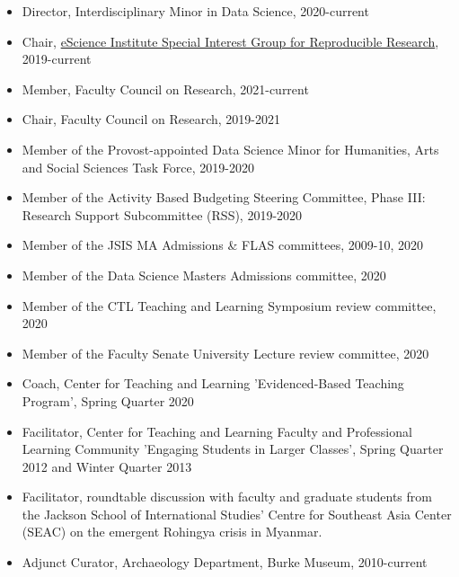 \begin{itemize}[noitemsep, font=$\bullet$\scshape\bfseries]

\item  Director, Interdisciplinary Minor in Data Science, 2020-current

\item Chair, \href{http://uwescience.github.io/reproducible/}{eScience Institute Special Interest Group for Reproducible Research}, 2019-current

\item  Member, Faculty Council on Research, 2021-current

\item  Chair, Faculty Council on Research, 2019-2021

\item  Member of the Provost-appointed Data Science Minor for Humanities, Arts and Social Sciences Task Force, 2019-2020

\item  Member of the Activity Based Budgeting Steering Committee, Phase III:  Research Support Subcommittee (RSS), 2019-2020

\item  Member of the JSIS MA Admissions \& FLAS committees, 2009-10, 2020

\item  Member of the Data Science Masters Admissions committee, 2020

\item  Member of the CTL Teaching and Learning Symposium review committee, 2020

\item  Member of the Faculty Senate University Lecture review committee, 2020

\item  Coach, Center for Teaching and Learning 'Evidenced-Based Teaching Program', Spring Quarter 2020

\item  Facilitator, Center for Teaching and Learning Faculty and Professional Learning Community 'Engaging Students in Larger Classes', Spring Quarter 2012 and Winter Quarter 2013

\item  Facilitator, roundtable discussion with faculty and graduate students from the Jackson School of International Studies’ Centre for Southeast Asia Center (SEAC) on the emergent Rohingya crisis in Myanmar. 

\item Adjunct Curator, Archaeology Department, Burke Museum, 2010-current


\end{itemize}

